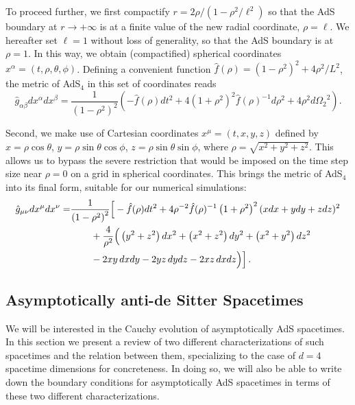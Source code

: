 \documentclass[a4paper,11pt]{article}
\numberwithin{equation}{section}
\begin{document}
To proceed further, we first compactify $r=2\rho/(1-\rho^2/\ell^2)$ so that the AdS boundary at $r \rightarrow +\infty$ is at a finite value of the new radial coordinate, $\rho=\ell$.
We hereafter set $\ell=1$ without loss of generality, so that the AdS boundary is at $\rho=1$. In this way, we obtain (compactified) spherical coordinates $x^\alpha=(t,\rho,\theta,\phi)$.
Defining a convenient function $\hat{f}(\rho) = (1-\rho^2)^2+4\rho^2/L^2$, the metric of AdS$_4$ in this set of coordinates reads 
\begin{equation}\label{eqn:ads4_compact}
\hat{g}_{\alpha\beta}dx^{\alpha}dx^{\beta} = \frac{1}{(1-\rho^2)^2} \left( -\hat{f}(\rho) dt^2 + 4(1+\rho^2)^2 \hat{f}(\rho)^{-1} d\rho^2 + 4\rho^2 d{\Omega_2}^2 \right).
\end{equation}

Second, we make use of Cartesian coordinates $x^\mu=(t,x,y,z)$ defined by $x=\rho\cos\theta$, $y=\rho\sin\theta\cos\phi$, $z=\rho\sin\theta\sin\phi$, where $\rho=\sqrt{x^2+y^2+z^2}$.
This allows us to bypass the severe restriction that would be imposed on the time step size near $\rho=0$ on a grid in spherical coordinates.
This brings the metric of AdS$_4$ into its final form, suitable for our numerical simulations:
\begin{eqnarray}\label{eqn:ads4_final}
\hat{g}_{\mu\nu}dx^{\mu}dx^{\nu}=&\frac{1}{\left(1-\rho^2\right)^2 }\Big[ -\hat{f}(\rho)dt^2 +4\rho^{-2}\hat{f}(\rho)^{-1} \left(1+\rho^2\right)^2 (x dx + y dy + z dz)^2 \nonumber \\
&\hspace{0.75cm}+\frac{4}{\rho^2} \Big(\left(y^2+z^2\right) dx^2 + \left(x^2+z^2\right) dy^2 + \left(x^2+y^2\right) dz^2 \nonumber\\
&\hspace{0.75cm}-2 x y\, dx dy - 2 y z\, dy dz - 2 x z\,dx dz\Big)\Big]\,.
\end{eqnarray}


\subsection{Asymptotically anti-de Sitter Spacetimes}\label{subsec:asyAdS}

We will be interested in the Cauchy evolution of asymptotically AdS spacetimes. 
In this section we present a review of two different characterizations of such spacetimes and the relation between them, specializing to the case of $d=4$ spacetime dimensions for concreteness. 
In doing so, we will also be able to write down the boundary conditions for asymptotically AdS spacetimes in terms of these two different characterizations.
\end{document}
